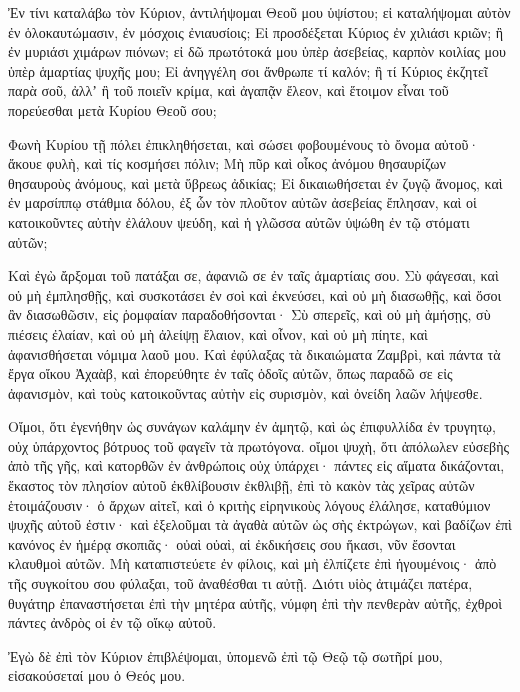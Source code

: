 \begin{spacing}{1.1}
\begin{multicols}{2}
Ἐν τίνι καταλάβω τὸν Κύριον, ἀντιλήψομαι Θεοῦ μου ὑψίστου; εἰ καταλήψομαι αὐτὸν ἐν ὁλοκαυτώμασιν, ἐν μόσχοις ἐνιαυσίοις;
Εἰ προσδέξεται Κύριος ἐν χιλιάσι κριῶν; ἢ ἐν μυριάσι χιμάρων πιόνων; εἰ δῶ πρωτότοκά μου ὑπὲρ ἀσεβείας, καρπὸν κοιλίας μου ὑπὲρ ἁμαρτίας ψυχῆς μου;
Εἰ ἀνηγγέλη σοι ἄνθρωπε τί καλόν; ἢ τί Κύριος ἐκζητεῖ παρὰ σοῦ, ἀλλʼ ἢ τοῦ ποιεῖν κρίμα, καὶ ἀγαπᾷν ἔλεον, καὶ ἕτοιμον εἶναι τοῦ πορεύεσθαι μετὰ Κυρίου Θεοῦ σου;

Φωνὴ Κυρίου τῇ πόλει ἐπικληθήσεται, καὶ σώσει φοβουμένους τὸ ὄνομα αὐτοῦ· ἄκουε φυλὴ, καὶ τίς κοσμήσει πόλιν;
Μὴ πῦρ καὶ οἶκος ἀνόμου θησαυρίζων θησαυροὺς ἀνόμους, καὶ μετὰ ὕβρεως ἀδικίας;
Εἰ δικαιωθήσεται ἐν ζυγῷ ἄνομος, καὶ ἐν μαρσίππῳ στάθμια δόλου,
ἐξ ὧν τὸν πλοῦτον αὐτῶν ἀσεβείας ἔπλησαν, καὶ οἱ κατοικοῦντες αὐτὴν ἐλάλουν ψεύδη, καὶ ἡ γλῶσσα αὐτῶν ὑψώθη ἐν τῷ στόματι αὐτῶν;

Καὶ ἐγὼ ἄρξομαι τοῦ πατάξαι σε, ἀφανιῶ σε ἐν ταῖς ἁμαρτίαις σου.
Σὺ φάγεσαι, καὶ οὐ μὴ ἐμπλησθῇς, καὶ συσκοτάσει ἐν σοὶ καὶ ἐκνεύσει, καὶ οὐ μὴ διασωθῇς, καὶ ὅσοι ἂν διασωθῶσιν, εἰς ῥομφαίαν παραδοθήσονται·
Σὺ σπερεῖς, καὶ οὐ μὴ ἀμήσῃς, σὺ πιέσεις ἐλαίαν, καὶ οὐ μὴ ἀλείψῃ ἔλαιον, καὶ οἶνον, καὶ οὐ μὴ πίητε, καὶ ἀφανισθήσεται νόμιμα λαοῦ μου.
Καὶ ἐφύλαξας τὰ δικαιώματα Ζαμβρὶ, καὶ πάντα τὰ ἔργα οἴκου Ἀχαὰβ, καὶ ἐπορεύθητε ἐν ταῖς ὁδοῖς αὐτῶν, ὅπως παραδῶ σε εἰς ἀφανισμὸν, καὶ τοὺς κατοικοῦντας αὐτὴν εἰς συρισμὸν, καὶ ὀνείδη λαῶν λήψεσθε.

Οἴμοι, ὅτι ἐγενήθην ὡς συνάγων καλάμην ἐν ἀμητῷ, καὶ ὡς ἐπιφυλλίδα ἐν τρυγητῳ, οὐχ ὑπάρχοντος βότρυος τοῦ φαγεῖν τὰ πρωτόγονα. οἴμοι ψυχὴ,
ὅτι ἀπόλωλεν εὐσεβὴς ἀπὸ τῆς γῆς, καὶ κατορθῶν ἐν ἀνθρώποις οὐχ ὑπάρχει· πάντες εἰς αἵματα δικάζονται, ἕκαστος τὸν πλησίον αὐτοῦ ἐκθλίβουσιν ἐκθλιβῇ,
ἐπὶ τὸ κακὸν τὰς χεῖρας αὐτῶν ἑτοιμάζουσιν· ὁ ἄρχων αἰτεῖ, καὶ ὁ κριτὴς εἰρηνικοὺς λόγους ἐλάλησε, καταθύμιον ψυχῆς αὐτοῦ ἐστιν· καὶ ἐξελοῦμαι τὰ ἀγαθὰ αὐτῶν
ὡς σὴς ἐκτρώγων, καὶ βαδίζων ἐπὶ κανόνος ἐν ἡμέρᾳ σκοπιᾶς· οὐαὶ οὐαὶ, αἱ ἐκδικήσεις σου ἥκασι, νῦν ἔσονται κλαυθμοὶ αὐτῶν.
Μὴ καταπιστεύετε ἐν φίλοις, καὶ μὴ ἐλπίζετε ἐπὶ ἡγουμένοις· ἀπὸ τῆς συγκοίτου σου φύλαξαι, τοῦ ἀναθέσθαι τι αὐτῇ.
Διότι υἱὸς ἀτιμάζει πατέρα, θυγάτηρ ἐπαναστήσεται ἐπὶ τὴν μητέρα αὐτῆς, νύμφη ἐπὶ τὴν πενθερὰν αὐτῆς, ἐχθροὶ πάντες ἀνδρὸς οἱ ἐν τῷ οἴκῳ αὐτοῦ.

Ἐγὼ δὲ ἐπὶ τὸν Κύριον ἐπιβλέψομαι, ὑπομενῶ ἐπὶ τῷ Θεῷ τῷ σωτῆρί μου, εἰσακούσεταί μου ὁ Θεός μου.


\end{multicols}
\end{spacing}
